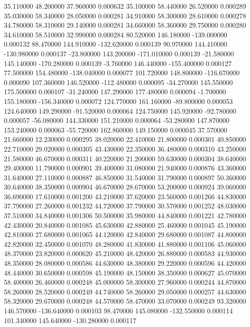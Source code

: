 35.110000 48.200000 37.960000 0.000632 
35.100000 58.440000 26.520000 0.000289 
35.030000 58.340000 28.050000 0.000281 
34.910000 58.300000 28.610000 0.000278 
34.780000 58.310000 29.140000 0.000281 
34.660000 58.360000 29.750000 0.000280 
34.610000 58.510000 32.990000 0.000284 
80.520000 146.180000 -139.000000 0.000132 
88.470000 144.910000 -132.620000 0.000139 
90.970000 144.410000 -130.980000 0.000137 
-23.800000 143.200000 -171.010000 0.000139 
-21.580000 145.140000 -170.280000 0.000139 
-3.760000 146.440000 -155.400000 0.000127 
77.500000 154.480000 -138.040000 0.000077 
101.720000 148.800000 -116.670000 0.000090 
107.360000 146.520000 -112.480000 0.000095 
-34.270000 145.550000 175.500000 0.000107 
-31.240000 147.290000 177.480000 0.000094 
-1.700000 155.180000 -156.340000 0.000072 
124.770000 161.160000 -89.800000 0.000053 
124.640000 149.290000 -91.520000 0.000064 
124.750000 145.920000 -92.780000 0.000057 
-56.080000 144.330000 151.210000 0.000064 
-53.280000 147.870000 153.240000 0.000063 
-55.720000 162.860000 149.150000 0.000045 
37.570000 21.660000 12.230000 0.000295 
38.020000 22.410000 21.800000 0.000301 
40.850000 22.710000 29.020000 0.000305 
43.430000 22.350000 36.480000 0.000310 
43.250000 21.580000 46.670000 0.000311 
40.220000 21.200000 59.630000 0.000304 
38.640000 29.400000 11.790000 0.000901 
39.400000 31.080000 21.940000 0.000876 
43.360000 31.640000 27.110000 0.000887 
46.850000 31.540000 31.790000 0.000897 
50.360000 30.640000 38.350000 0.000904 
46.670000 28.670000 53.200000 0.000924 
39.060000 36.690000 17.610000 0.001200 
43.210000 37.620000 23.560000 0.001266 
44.830000 37.790000 27.260000 0.001232 
44.720000 37.790000 30.570000 0.001252 
48.030000 37.510000 34.840000 0.001306 
50.500000 35.980000 44.840000 0.001221 
42.780000 42.430000 20.840000 0.001085 
45.630000 42.880000 25.460000 0.001045 
45.190000 42.810000 27.680000 0.001065 
44.120000 42.840000 29.680000 0.001087 
44.800000 42.820000 32.450000 0.001070 
48.280000 41.830000 41.880000 0.001106 
45.060000 48.370000 23.820000 0.000620 
45.210000 48.420000 26.880000 0.000583 
44.930000 48.350000 28.080000 0.000586 
44.630000 48.380000 29.220000 0.000596 
44.420000 48.440000 30.650000 0.000598 
45.190000 48.150000 38.350000 0.000627 
45.070000 58.400000 26.460000 0.000248 
45.000000 58.300000 27.960000 0.000244 
44.870000 58.260000 28.520000 0.000249 
44.740000 58.260000 29.050000 0.000257 
44.630000 58.320000 29.670000 0.000248 
44.570000 58.470000 33.070000 0.000249 
93.320000 146.570000 -136.640000 0.000103 
98.470000 145.080000 -132.550000 0.000114 
101.340000 145.640000 -130.280000 0.000117 
